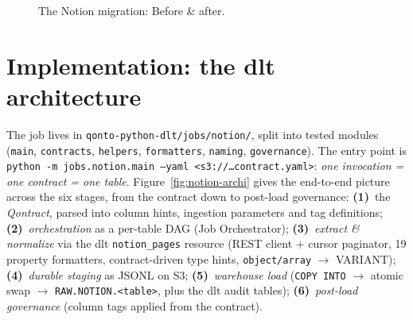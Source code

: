 \begin{figure}[H]
\centering
{}
\caption{The Notion migration: Before \& after.}
\label{fig:notion-ba}
\end{figure}

\section{Implementation: the dlt architecture}

The job lives in \texttt{qonto-python-dlt/jobs/notion/}, split into tested modules (\texttt{main}, \texttt{contracts}, \texttt{helpers}, \texttt{formatters}, \texttt{naming}, \texttt{governance}). The entry point is \texttt{python -m jobs.notion.main --yaml <s3://\dots contract.yaml>}: \emph{one invocation = one contract = one table}. Figure~\ref{fig:notion-archi} gives the end-to-end picture across the six stages, from the contract down to post-load governance: \textbf{(1)}~the \emph{Qontract}, parsed into column hints, ingestion parameters and tag definitions; \textbf{(2)}~\emph{orchestration} as a per-table DAG (Job Orchestrator); \textbf{(3)}~\emph{extract \& normalize} via the dlt \texttt{notion\_pages} resource (REST client + cursor paginator, 19 property formatters, contract-driven type hints, \texttt{object/array} $\rightarrow$ VARIANT); \textbf{(4)}~\emph{durable staging} as JSONL on S3; \textbf{(5)}~\emph{warehouse load} (\texttt{COPY INTO} $\rightarrow$ atomic swap $\rightarrow$ \texttt{RAW.NOTION.<table>}, plus the dlt audit tables); \textbf{(6)}~\emph{post-load governance} (column tags applied from the contract).

